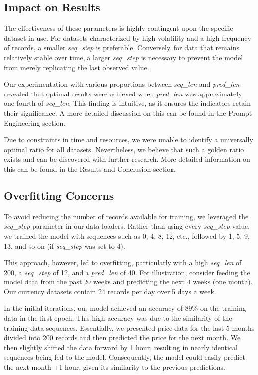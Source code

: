 \subsection{Impact on Results}
The effectiveness of these parameters is highly contingent upon the specific dataset in use. For datasets characterized by high volatility and a high frequency of records, a smaller \textit{seq\_step} is preferable. Conversely, for data that remains relatively stable over time, a larger \textit{seq\_step} is necessary to prevent the model from merely replicating the last observed value.

Our experimentation with various proportions between \textit{seq\_len} and \textit{pred\_len} revealed that optimal results were achieved when \textit{pred\_len} was approximately one-fourth of \textit{seq\_len}. This finding is intuitive, as it ensures the indicators retain their significance. A more detailed discussion on this can be found in the Prompt Engineering section.

Due to constraints in time and resources, we were unable to identify a universally optimal ratio for all datasets. Nevertheless, we believe that such a golden ratio exists and can be discovered with further research. More detailed information on this can be found in the Results and Conclusion section.

\subsection{Overfitting Concerns}
To avoid reducing the number of records available for training, we leveraged the \textit{seq\_step} parameter in our data loaders. Rather than using every \textit{seq\_step} value, we trained the model with sequences such as 0, 4, 8, 12, etc., followed by 1, 5, 9, 13, and so on (if \textit{seq\_step} was set to 4).

This approach, however, led to overfitting, particularly with a high \textit{seq\_len} of 200, a \textit{seq\_step} of 12, and a \textit{pred\_len} of 40. For illustration, consider feeding the model data from the past 20 weeks and predicting the next 4 weeks (one month). Our currency datasets contain 24 records per day over 5 days a week.

In the initial iterations, our model achieved an accuracy of 89\% on the training data in the first epoch. This high accuracy was due to the similarity of the training data sequences. Essentially, we presented price data for the last 5 months divided into 200 records and then predicted the price for the next month. We then slightly shifted the data forward by 1 hour, resulting in nearly identical sequences being fed to the model. Consequently, the model could easily predict the next month +1 hour, given its similarity to the previous predictions.

